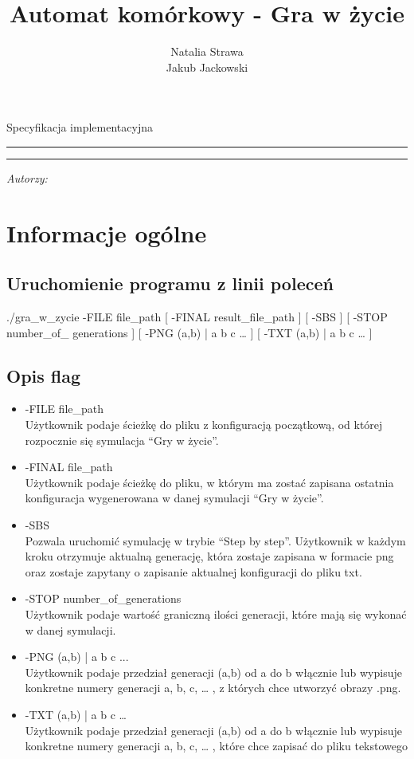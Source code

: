 \documentclass[12pt,a4paper,notitlepage]{report}
\author{Natalia Strawa\\
		Jakub Jackowski}
\title{Automat komórkowy - Gra w życie}
\makeatletter
\newcommand{\linia}{\rule{\linewidth}{0.4mm}}
\renewcommand{\maketitle}{\begin{titlepage}

\thispagestyle{fancy}

    \vspace*{1cm}

    \begin{center}
    
    \Large

    Specyfikacja implementacyjna
    
    \end{center}

    \vspace{3cm}

    \noindent\linia

    \begin{center}

      \LARGE \textsc{\@title}

         \end{center}

     \noindent\linia

    \vspace{0.5cm}

    \begin{flushright}

    \begin{minipage}{5cm}

    \textit{\small Autorzy:}\\

    \normalsize \textsc{\@author} \par

    \end{minipage}


     \end{flushright}

    \vspace*{\stretch{6}}


  \end{titlepage}%

}
\makeatother
\begin{document}
\maketitle
\newpage
\tableofcontents
\setcounter{page}{2}
\thispagestyle{fancy}
\newpage

\section{Informacje ogólne}
\subsection{Uruchomienie programu z linii poleceń}
./gra\_w\_zycie -FILE file\_path [ -FINAL result\_file\_path ] [ -SBS ] [ -STOP number\_of\_ generations ] [ -PNG (a,b) | a b c … ] [ -TXT (a,b) | a b c … ] 

\subsection{Opis flag}
\begin{itemize}
	\item -FILE file\_path\\
	Użytkownik podaje ścieżkę do pliku z konfiguracją początkową, od której rozpocznie się symulacja “Gry w życie”.
	\item -FINAL file\_path\\
	Użytkownik podaje ścieżkę do pliku, w którym ma zostać zapisana ostatnia konfiguracja wygenerowana w danej symulacji “Gry w życie”.
	\item -SBS\\
	Pozwala uruchomić symulację w trybie “Step by step”. Użytkownik w każdym kroku otrzymuje aktualną generację, która zostaje zapisana w formacie png oraz zostaje zapytany o zapisanie aktualnej konfiguracji do pliku txt.
	\item -STOP number\_of\_generations\\
	Użytkownik podaje wartość graniczną ilości generacji, które mają się wykonać w danej symulacji.
	\item -PNG (a,b) | a b c ...\\
	Użytkownik podaje przedział generacji (a,b) od a do b włącznie lub wypisuje konkretne numery generacji a, b, c, … , z których chce utworzyć obrazy .png.
	\item -TXT (a,b) | a b c …\\
	Użytkownik podaje przedział generacji (a,b) od a do b włącznie lub wypisuje konkretne numery generacji a, b, c, … , które chce zapisać do pliku tekstowego
	
\end{itemize}	
\end{document}

